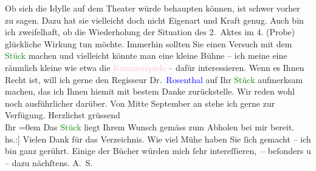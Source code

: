           \pstart
           Ob sich die Idylle auf dem Theater würde behaupten können, ist schwer vorher zu
               sagen. Dazu hat sie vielleicht doch nicht Eigenart und Kraft genug. Auch bin ich
               zweifelhaft, ob die Wiederholung der Situation des 2. Aktes im 4. (Probe) glückliche
               Wirkung tun möchte. Immerhin sollten Sie einen Versuch mit dem {\pb}\textcolor{green}{Stück}{} machen und vielleicht
               könnte man eine kleine Bühne – ich meine eine räumlich kleine wie etwa die \textcolor{pink}{Kammerspiele}{}\ledrightnote{\textcolor{pink}{Kammerspiele Wien}} – dafür interessieren. Wenn es Ihnen
               Recht ist, will ich gerne den Regisseur Dr. \textcolor{blue}{Rosenthal}{}\ledrightnote{\textcolor{blue}{Friedrich Rosenthal}} auf Ihr \textcolor{green}{Stück}{}
               aufmerksam machen, das ich Ihnen hiemit mit bestem Danke zurückstelle. Wir reden wohl
               noch ausführlicher darüber. Von Mitte September an stehe ich gerne zur
               Verfügung.\pend
           \pstart
           Herzlichst grüssend{\\[\baselineskip]}Ihr \pend
           \leftskip=0em{}\pstart
           \noindent{}Das \textcolor{green}{Stück}{} liegt Ihrem Wunsch
                  gemäss zum Abholen bei mir bereit.\pend
           \pstart
           \noindent{}{[}hs.:{]} Vielen Dank für das Verzeichnis. Wie viel Mühe haben Sie ſich gemacht –
               ich bin ganz gerührt. Einige der Bücher würden mich ſehr intereſſieren, – beſonders
                  \label{K_L02298_1v}\label{K_L02298_1h} u \label{K_L02298_2v}\label{K_L02298_2h} – dazu nächſtens. \spacefill\mbox{A. S.}\pend
           \endnumbering{}  
      